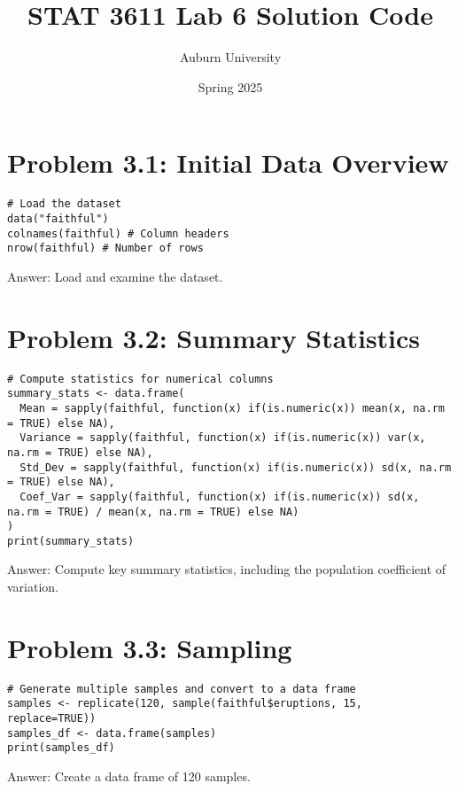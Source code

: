 \documentclass{article}
\begin{document}
\title{STAT 3611 Lab 6 Solution Code}
\author{Auburn University}
\date{Spring 2025}
\maketitle

\section{Problem 3.1: Initial Data Overview}
\begin{tcolorbox}
\begin{lstlisting}
# Load the dataset
data("faithful")
colnames(faithful) # Column headers
nrow(faithful) # Number of rows
\end{lstlisting}
\end{tcolorbox}
Answer: Load and examine the dataset.

\section{Problem 3.2: Summary Statistics}
\begin{tcolorbox}
\begin{lstlisting}
# Compute statistics for numerical columns
summary_stats <- data.frame(
  Mean = sapply(faithful, function(x) if(is.numeric(x)) mean(x, na.rm = TRUE) else NA),
  Variance = sapply(faithful, function(x) if(is.numeric(x)) var(x, na.rm = TRUE) else NA),
  Std_Dev = sapply(faithful, function(x) if(is.numeric(x)) sd(x, na.rm = TRUE) else NA),
  Coef_Var = sapply(faithful, function(x) if(is.numeric(x)) sd(x, na.rm = TRUE) / mean(x, na.rm = TRUE) else NA)
)
print(summary_stats)
\end{lstlisting}
\end{tcolorbox}
Answer: Compute key summary statistics, including the population coefficient of variation.

\section{Problem 3.3: Sampling}
\begin{tcolorbox}
\begin{lstlisting}
# Generate multiple samples and convert to a data frame
samples <- replicate(120, sample(faithful$eruptions, 15, replace=TRUE))
samples_df <- data.frame(samples)
print(samples_df)
\end{lstlisting}
\end{tcolorbox}
Answer: Create a data frame of 120 samples.
\end{document}
